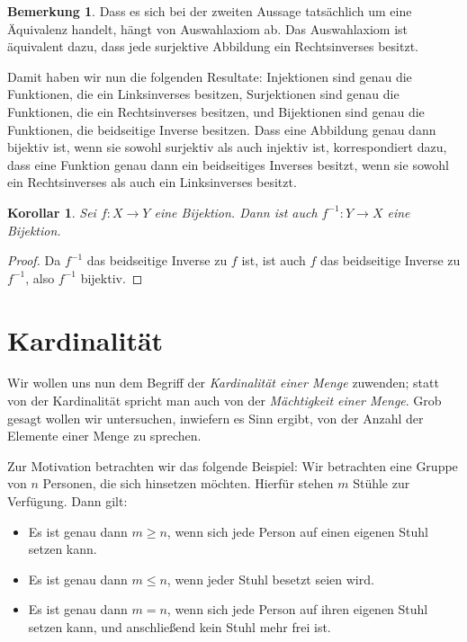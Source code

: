 \documentclass[a4paper,10pt]{article}
\newcounter{propositions}
\newtheorem{kor}[propositions]{Korollar}
\theoremstyle{definition}
\newtheorem*{bem}{Bemerkung}
\begin{document}
\begin{bem}
 Dass es sich bei der zweiten Aussage tatsächlich um eine Äquivalenz handelt, hängt von Auswahlaxiom ab. Das Auswahlaxiom ist äquivalent dazu, dass jede surjektive Abbildung ein Rechtsinverses besitzt.
\end{bem}

Damit haben wir nun die folgenden Resultate: Injektionen sind genau die Funktionen, die ein Linksinverses besitzen, Surjektionen sind genau die Funktionen, die ein Rechtsinverses besitzen, und Bijektionen sind genau die Funktionen, die beidseitige Inverse besitzen. Dass eine Abbildung genau dann bijektiv ist, wenn sie sowohl surjektiv als auch injektiv ist, korrespondiert dazu, dass eine Funktion genau dann ein beidseitiges Inverses besitzt, wenn sie sowohl ein Rechtsinverses als auch ein Linksinverses besitzt.


\begin{kor}
 Sei $f \colon X \to Y$ eine Bijektion. Dann ist auch $f^{-1} \colon Y \to X$ eine Bijektion.
\end{kor}
\begin{proof}
 Da $f^{-1}$ das beidseitige Inverse zu $f$ ist, ist auch $f$ das beidseitige Inverse zu $f^{-1}$, also $f^{-1}$ bijektiv.
\end{proof}





\section{Kardinalität}

Wir wollen uns nun dem Begriff der \emph{Kardinalität einer Menge} zuwenden; statt von der Kardinalität spricht man auch von der \emph{Mächtigkeit einer Menge}. Grob gesagt wollen wir untersuchen, inwiefern es Sinn ergibt, von der Anzahl der Elemente einer Menge zu sprechen.

Zur Motivation betrachten wir das folgende Beispiel: Wir betrachten eine Gruppe von $n$ Personen, die sich hinsetzen möchten. Hierfür stehen $m$ Stühle zur Verfügung. Dann gilt:
\begin{itemize}
 \item
  Es ist genau dann $m \geq n$, wenn sich jede Person auf einen eigenen Stuhl setzen kann.
 \item
  Es ist genau dann $m \leq n$, wenn jeder Stuhl besetzt seien wird.
 \item
  Es ist genau dann $m = n$, wenn sich jede Person auf ihren eigenen Stuhl setzen kann, und anschließend kein Stuhl mehr frei ist.
\end{itemize}
\end{document}
